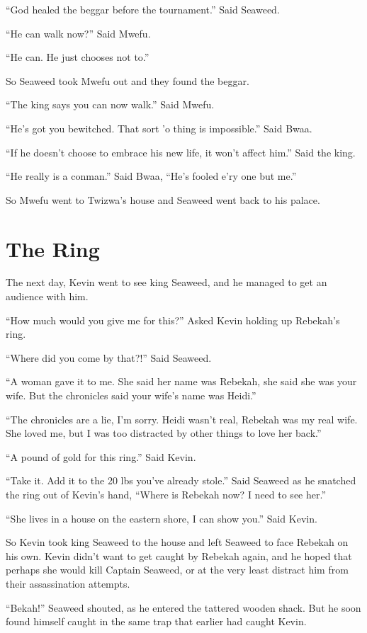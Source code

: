 ``God healed the beggar before the tournament.'' Said Seaweed.

``He can walk now?'' Said Mwefu.

``He can. He just chooses not to.''

So Seaweed took Mwefu out and they found the beggar.

``The king says you can now walk.'' Said Mwefu.

``He's got you bewitched. That sort 'o thing is impossible.'' Said Bwaa.

``If he doesn't choose to embrace his new life, it won't affect him.'' Said the king.

``He really is a conman.'' Said Bwaa, ``He's fooled e'ry one but me.''

So Mwefu went to Twizwa's house and Seaweed went back to his palace.


\section{The Ring}
The next day, Kevin went to see king Seaweed, and he managed to get an audience with him.

``How much would you give me for this?'' Asked Kevin holding up Rebekah's ring.

``Where did you come by that?!'' Said Seaweed.

``A woman gave it to me. She said her name was Rebekah, she said she was your wife. But the chronicles said your wife's name was Heidi.''

``The chronicles are a lie, I'm sorry.
Heidi wasn't real, Rebekah was my real wife.
She loved me, but I was too distracted by other things to love her back.''

``A pound of gold for this ring.'' Said Kevin.

``Take it. Add it to the 20 lbs you've already stole.'' Said Seaweed as he snatched the ring out of Kevin's hand, ``Where is Rebekah now? I need to see her.''

``She lives in a house on the eastern shore, I can show you.'' Said Kevin.

So Kevin took king Seaweed to the house and left Seaweed to face Rebekah on his own. Kevin didn't want to get caught by Rebekah again, and he hoped that perhaps she would kill Captain Seaweed, or at the very least distract him from their assassination attempts.

``Bekah!'' Seaweed shouted, as he entered the tattered wooden shack. But he soon found himself caught in the same trap that earlier had caught Kevin.

